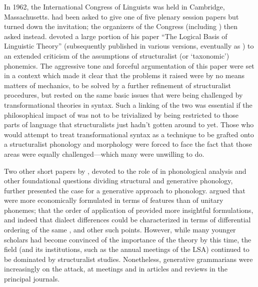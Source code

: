 In 1962, the {International Congress of Linguists} was held in
Cambridge, Massachusetts.  had been asked to give one of
five plenary session papers but turned down the invitation; the
organizers of the Congress (including ) then asked {\Chomsky}
instead. {\Chomsky} devoted a large portion of his paper ``The Logical
Basis of Linguistic Theory'' (subsequently published in various
versions, eventually as \citealt{chomsky64:cilt}) to an extended
criticism of the assumptions of structuralist (or `taxonomic')
phonemics. The aggressive tone and forceful argumentation of this
paper were set in a context which made it clear that the problems it
raised were by no means matters of mechanics, to be solved by a
further refinement of structuralist procedures, but rested on the same
basic issues that were being challenged by transformational theories
in syntax. Such a linking of the two was essential if the
philosophical impact of  was not to be trivialized
by being restricted to those parts of language that structuralists
just hadn't gotten around to yet. Those who would attempt to treat
transformational syntax as a technique to be grafted onto a
structuralist phonology and morphology were forced to face the fact
that those areas were equally challenged—which many were unwilling to
do.

Two other short papers by \citet{halle62:pigg,halle64:bases}, devoted
to the role of  in phonological analysis and other
foundational questions dividing structural and generative phonology,
further presented the case for a generative approach to
phonology. {\Halle} argued that  were more economically
formulated in terms of features than of unitary phonemes; that the
order of application of  provided more insightful formulations,
and indeed that dialect differences could be characterized in terms of
differential ordering of the same , and other such
points. However, while many younger scholars had become convinced of
the importance of the theory by this time, the field (and its
institutions, such as the annual meetings of the LSA) continued to be
dominated by structuralist studies. Nonetheless, generative
grammarians were increasingly on the attack, at meetings and in
articles and reviews in the principal journals.


